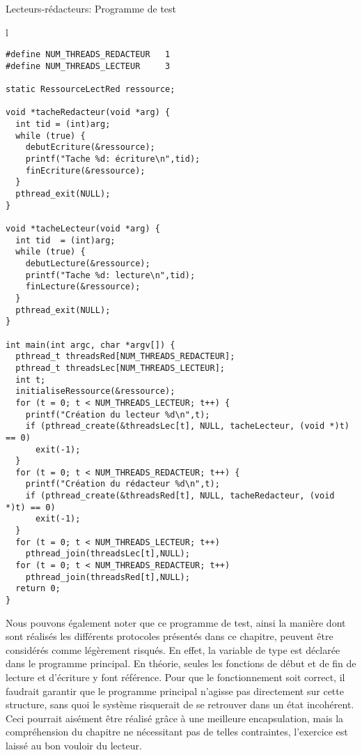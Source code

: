 \begin{algorithm}[h!tp]
\caption{Lecteurs-rédacteurs: Programme de test}\label{lectredtest}
\centering
\begin{tabular}{l}
\lstset{language=C++}
\begin{lstlisting}
#define NUM_THREADS_REDACTEUR   1
#define NUM_THREADS_LECTEUR     3

static RessourceLectRed ressource;

void *tacheRedacteur(void *arg) {
  int tid = (int)arg;
  while (true) {
    debutEcriture(&ressource);
    printf("Tache %d: écriture\n",tid);
    finEcriture(&ressource);
  }
  pthread_exit(NULL);
}

void *tacheLecteur(void *arg) {
  int tid  = (int)arg;
  while (true) {
    debutLecture(&ressource);
    printf("Tache %d: lecture\n",tid);
    finLecture(&ressource);
  }
  pthread_exit(NULL);
}

int main(int argc, char *argv[]) {
  pthread_t threadsRed[NUM_THREADS_REDACTEUR];
  pthread_t threadsLec[NUM_THREADS_LECTEUR];
  int t;
  initialiseRessource(&ressource);
  for (t = 0; t < NUM_THREADS_LECTEUR; t++) {
    printf("Création du lecteur %d\n",t);
    if (pthread_create(&threadsLec[t], NULL, tacheLecteur, (void *)t) == 0)
      exit(-1);
  }
  for (t = 0; t < NUM_THREADS_REDACTEUR; t++) {
    printf("Création du rédacteur %d\n",t);
    if (pthread_create(&threadsRed[t], NULL, tacheRedacteur, (void *)t) == 0)
      exit(-1);
  }
  for (t = 0; t < NUM_THREADS_LECTEUR; t++)
    pthread_join(threadsLec[t],NULL);
  for (t = 0; t < NUM_THREADS_REDACTEUR; t++)
    pthread_join(threadsRed[t],NULL);
  return 0;
}
\end{lstlisting}
\end{tabular}

\end{algorithm}

Nous pouvons également noter que ce programme de test, ainsi la manière dont sont réalisés les différents protocoles présentés dans ce chapitre, peuvent être considérés comme légèrement risqués. En effet, la variable de type  est déclarée dans le programme principal. En théorie, seules les fonctions de début et de fin de lecture et d'écriture y font référence. Pour que le fonctionnement soit correct, il faudrait garantir que le programme principal n'agisse pas directement sur cette structure, sans quoi le système risquerait de se retrouver dans un état incohérent. Ceci pourrait aisément être réalisé grâce à une meilleure encapsulation, mais la compréhension du chapitre ne nécessitant pas de telles contraintes, l'exercice est laissé au bon vouloir du lecteur.


